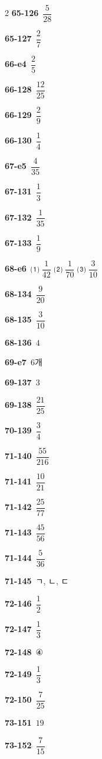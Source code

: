 \documentclass[10pt,a4paper]{article}
\begin{document}
\begin{multicols}{2}
\noindent\textbf{65-126}\ $\dfrac{5}{28}$\par
\noindent\textbf{65-127}\ $\dfrac{2}{7}$\par
\noindent\textbf{66-e4}\ $\dfrac{2}{5}$\par
\noindent\textbf{66-128}\ $\dfrac{12}{25}$\par
\noindent\textbf{66-129}\ $\dfrac{2}{9}$\par
\noindent\textbf{66-130}\ $\dfrac{1}{4}$\par
\noindent\textbf{67-e5}\ $\dfrac{4}{35}$\par
\noindent\textbf{67-131}\ $\dfrac{1}{3}$\par
\noindent\textbf{67-132}\ $\dfrac{1}{35}$\par
\noindent\textbf{67-133}\ $\dfrac{1}{9}$\par
\noindent\textbf{68-e6}\ ⑴ $\dfrac{1}{42}$ ⑵ $\dfrac{1}{70}$ ⑶ $\dfrac{3}{10}$\par
\noindent\textbf{68-134}\ $\dfrac{9}{20}$\par
\noindent\textbf{68-135}\ $\dfrac{3}{10}$\par
\noindent\textbf{68-136}\ $4$\par
\noindent\textbf{69-e7}\ $6$개\par
\noindent\textbf{69-137}\ $3$\par
\noindent\textbf{69-138}\ $\dfrac{21}{25}$\par
\noindent\textbf{70-139}\ $\dfrac{3}{4}$\par
\noindent\textbf{71-140}\ $\dfrac{55}{216}$\par
\noindent\textbf{71-141}\ $\dfrac{10}{21}$\par
\noindent\textbf{71-142}\ $\dfrac{25}{77}$\par
\noindent\textbf{71-143}\ $\dfrac{45}{56}$\par
\noindent\textbf{71-144}\ $\dfrac{5}{36}$\par
\noindent\textbf{71-145}\ ㄱ, ㄴ, ㄷ\par
\noindent\textbf{72-146}\ $\dfrac{1}{2}$\par
\noindent\textbf{72-147}\ $\dfrac{1}{3}$\par
\noindent\textbf{72-148}\ ④\par
\noindent\textbf{72-149}\ $\dfrac{1}{3}$\par
\noindent\textbf{72-150}\ $\dfrac{7}{25}$\par
\noindent\textbf{73-151}\ $19$\par
\noindent\textbf{73-152}\ $\dfrac{7}{15}$\par

\end{multicols}
\end{document}
